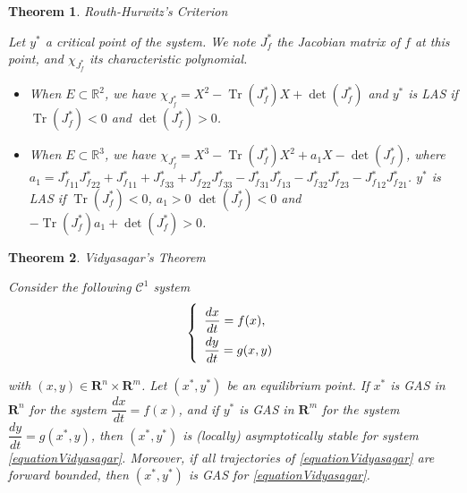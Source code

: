 \documentclass{article}
\DeclareMathOperator{\Tr}{Tr}
\newtheorem{theorem}{Theorem}
\begin{document}
\begin{theorem} Routh-Hurwitz's Criterion \label{theorem:Routh-Hurwitz}

Let $y^*$ a critical point of the system. We note $J_f^*$ the Jacobian matrix of $f$ at this point, and $\chi_{J_f^*}$ its characteristic polynomial.

\begin{itemize}
\item When $E\subset \mathbb{R}^2$, we have $\chi_{J_f^*} = X^2 - \Tr(J_f^*) X + \det(J_f^*)$ and $y^*$ is LAS if $\Tr(J_f^*) < 0$ and $\det(J_f^*) > 0$.
\item When $E\subset \mathbb{R}^3$, we have $\chi_{J_f^*} = X^3 - \Tr(J_f^*) X^2 + a_1 X - \det(J_f^*)$, where $a_1 = J{_f^*}_{11}J{_f^*}_{22} + J{_f^*}_{11} + J{_f^*}_{33} + J{_f^*}_{22}J{_f^*}_{33} - J{_f^*}_{31}J{_f^*}_{13} - J{_f^*}_{32}J{_f^*}_{23} - J{_f^*}_{12}J{_f^*}_{21}$.  $y^*$ is LAS if $\Tr(J_f^*) < 0$, $a_1 > 0$ $\det(J_f^*) < 0$ and $-\Tr(J_f^*) a_1 + \det(J_f^*) > 0$.
\end{itemize}
\end{theorem}

\begin{theorem} Vidyasagar's Theorem \label{theorem:Vidyasagar} \cite{vidyasagar_decomposition_1980, dumont_mathematical_2012}

Consider the following $\mathcal{C}^1$ system
\begin{equation}
\def\arraystretch{2}
\left\{ \begin{array}{l}
\dfrac{dx}{dt} = f(x), \\
\dfrac{dy}{dt} = g(x, y) 
\end{array} \right.
\label{equationVidyasagar}
\end{equation}

with $(x, y) \in \mathbf{R}^n \times\mathbf{R}^m$. Let $(x^*, y^*)$ be an equilibrium point.
If $x^*$ is GAS in $\mathbf{R}^n$ for the system $\dfrac{dx}{dt} = f(x)$, and if $y^*$ is GAS in $\mathbf{R}^m$ for the system $\dfrac{dy}{dt} = g(x^*, y)$, then $(x^*, y^*)$ is (locally) asymptotically stable for system \eqref{equationVidyasagar}. Moreover, if all trajectories of \eqref{equationVidyasagar} are forward bounded, then $(x^*, y^*)$ is GAS for \eqref{equationVidyasagar}.
\end{theorem}
\end{document}
